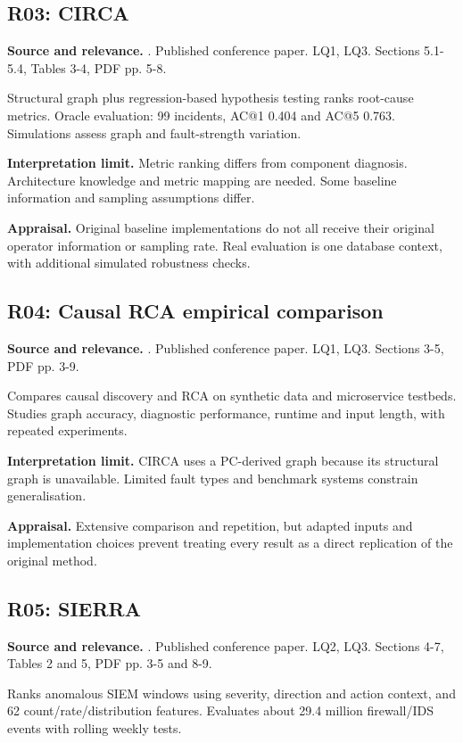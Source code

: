 \subsection{R03: CIRCA}
\noindent\textbf{Source and relevance.} \parencite{li2022circa}. Published conference paper. LQ1, LQ3. Sections 5.1-5.4, Tables 3-4, PDF pp. 5-8.

Structural graph plus regression-based hypothesis testing ranks root-cause metrics. Oracle evaluation: 99 incidents, AC@1 0.404 and AC@5 0.763. Simulations assess graph and fault-strength variation.

\noindent\textbf{Interpretation limit.} Metric ranking differs from component diagnosis. Architecture knowledge and metric mapping are needed. Some baseline information and sampling assumptions differ.

\noindent\textbf{Appraisal.} Original baseline implementations do not all receive their original operator information or sampling rate. Real evaluation is one database context, with additional simulated robustness checks.

\subsection{R04: Causal RCA empirical comparison}
\noindent\textbf{Source and relevance.} \parencite{pham2024howfar}. Published conference paper. LQ1, LQ3. Sections 3-5, PDF pp. 3-9.

Compares causal discovery and RCA on synthetic data and microservice testbeds. Studies graph accuracy, diagnostic performance, runtime and input length, with repeated experiments.

\noindent\textbf{Interpretation limit.} CIRCA uses a PC-derived graph because its structural graph is unavailable. Limited fault types and benchmark systems constrain generalisation.

\noindent\textbf{Appraisal.} Extensive comparison and repetition, but adapted inputs and implementation choices prevent treating every result as a direct replication of the original method.

\subsection{R05: SIERRA}
\noindent\textbf{Source and relevance.} \parencite{lee2022sierra}. Published conference paper. LQ2, LQ3. Sections 4-7, Tables 2 and 5, PDF pp. 3-5 and 8-9.

Ranks anomalous SIEM windows using severity, direction and action context, and 62 count/rate/distribution features. Evaluates about 29.4 million firewall/IDS events with rolling weekly tests.

